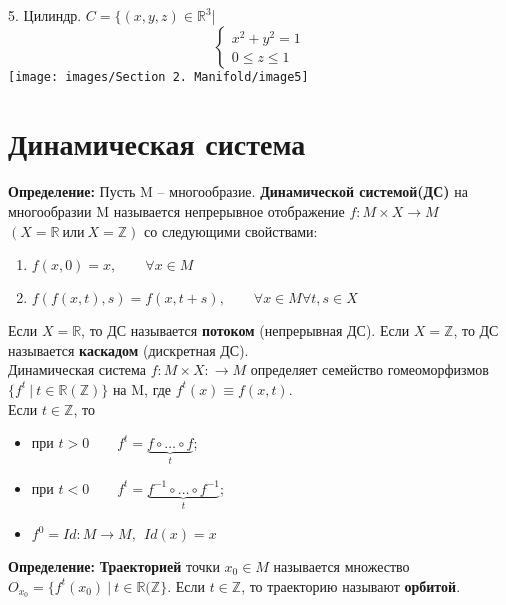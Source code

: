 \documentclass[12pt,a4paper]{article}
\begin{document}
5. Цилиндр.
\newline \(C = \{(x,y,z)\in \mathbb{R}^3\)|
\begin{equation*}
\begin{cases}
x^2+y^2=1
\\
0\leq z\leq1 
\end{cases}
\end{equation*}
\texttt{[image: images/Section 2. Manifold/image5]}
\newpage

\section*{Динамическая система}

\textbf{\large{Определение:}} Пусть M -- многообразие. \textbf{Динамической системой(ДС)} 
на многообразии M называется непрерывное отображение $f:M\times X \rightarrow M~$ $(X = \mathbb{R}~ \textit{или}~ X = \mathbb{Z})$ со следующими свойствами:

\begin{enumerate}
\item $f(x,0) = x,\qquad \forall x \in M$
\item $f(f(x,t),s) = f(x, t+s),\qquad \forall x \in M \forall t,s \in X$ 
\end{enumerate} 

Если $X = \mathbb{R}$, то ДС называется \textbf{потоком} (непрерывная ДС).
Если $X = \mathbb{Z}$, то ДС называется \textbf{каскадом} (дискретная ДС).\\

Динамическая система $f:M\times X: \rightarrow M$ определяет семейство гомеоморфизмов $\{ f^t~|~ t \in \mathbb{R}(\mathbb{Z}) \}$ на M, где $f^t(x) \equiv f(x,t)$. \\

Если $t \in \mathbb{Z}$, то
\begin{itemize}
\item при $t > 0 \qquad f^t = \underbrace{f \circ \ldots \circ f}_t$;
\item при $t < 0 \qquad f^t = \underbrace{f^{-1} \circ \ldots \circ f^{-1}}_t$;
\item $f^0 = Id:M \rightarrow M, ~~ Id(x) = x$
\end{itemize}

\textbf{\large{Определение:}} \textbf{Траекторией} точки $x_0 \in M$ называется множество $O_{x_0} = \{f^t(x_0)~|~ t \in \mathbb{R(\mathbb{Z}} \}$. Если $t \in \mathbb{Z}$, то траекторию называют \textbf{орбитой}.\\
\end{document}
